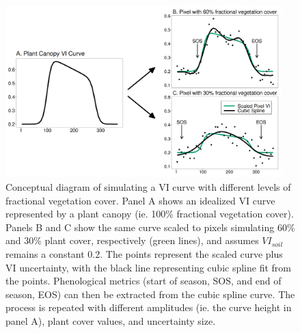 \documentclass{article}
\begin{document}

\begin{figure}[h]
    \centering
    \includegraphics[width=0.95\textwidth]{figures/fig1_conceptual_vi_curve.png}
    \caption{Conceptual diagram of simulating a VI curve with different levels of fractional vegetation cover. Panel A shows an idealized VI curve represented by a plant canopy (ie. 100\% fractional vegetation cover). Panels B and C show the same curve scaled to pixels simulating 60\% and 30\% plant cover, respectively (green lines), and assumes $VI_{soil}$ remains a constant 0.2. The points represent the scaled curve plus VI uncertainty, with the black line representing cubic spline fit from the points. Phenological metrics (start of season, SOS, and end of season, EOS) can then be extracted from the cubic spline curve. The process is repeated with different amplitudes (ie. the curve height in panel A), plant cover values, and uncertainty size.}
    \label{fig1}
\end{figure}
\end{document}
